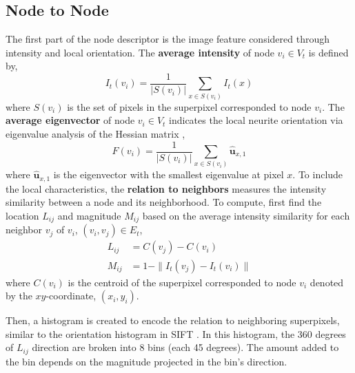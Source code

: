 \documentclass{article}
\begin{document}
\subsection{Node to Node}
The first part of the node descriptor is the image feature considered through intensity and local orientation. The \textbf{average intensity} of node $v_i \in V_t$ is defined by,
\begin{equation}
I_t(v_i) = \frac{1}{|S(v_i)|}\sum_{x \in S(v_i)} I_t(x)
\end{equation} 
where $S(v_i)$ is the set of pixels in the superpixel corresponded to node $v_i$. The \textbf{average eigenvector} of node $v_i \in V_t$ indicates the local neurite orientation via eigenvalue analysis of the Hessian matrix \cite{frangi1998},
\begin{equation}
F(v_i) = \frac{1}{|S(v_i)|}\sum_{x \in S(v_i)} \hat{\textbf{u}}_{x,1}
\end{equation}
where $\hat{\textbf{u}}_{x,1}$ is the eigenvector with the smallest eigenvalue at pixel $x$.
To include the local characteristics, the \textbf{relation to neighbors} measures the intensity similarity between a node and its neighborhood. To compute, first find the location $L_{ij}$ and magnitude $M_{ij}$ based on the average intensity similarity for each neighbor $v_j$ of $v_i$, $(v_i, v_j) \in E_t$,
\begin{equation}
\begin{aligned}
L_{ij} & = C(v_j) - C(v_i) \\
M_{ij} & = 1 - \| I_t(v_j) - I_t(v_i) \|
\end{aligned}
\end{equation}
where $C(v_i)$ is the centroid of the superpixel corresponded to node $v_i$ denoted by the $xy$-coordinate, $(x_i, y_i)$.

Then, a histogram is created to encode the relation to neighboring superpixels, similar to the orientation histogram in SIFT \cite{Lowe1999}. In this histogram, the 360 degrees of $L_{ij}$ direction are broken into 8 bins (each 45 degrees). The amount added to the bin depends on the magnitude projected in the bin's direction.
\end{document}

